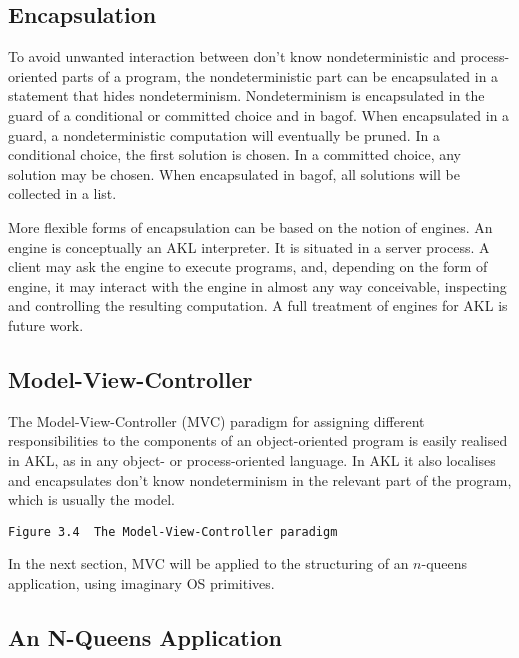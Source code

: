 \subsection{Encapsulation}

To avoid unwanted interaction between don't know nondeterministic and
process-oriented parts of a program, the nondeterministic part can be
encapsulated in a statement that hides nondeterminism.  Nondeterminism
is encapsulated in the guard of a conditional or committed choice and
in bagof.  When encapsulated in a guard, a nondeterministic
computation will eventually be pruned.  In a conditional choice, the
first solution is chosen.  In a committed choice, any solution may be
chosen.  When encapsulated in bagof, all solutions will be collected
in a list.

More flexible forms of encapsulation can be based on the notion of
engines.  An engine is conceptually an AKL interpreter.  It is situated
in a server process.  A client may ask the engine to execute programs,
and, depending on the form of engine, it may interact with the engine
in almost any way conceivable, inspecting and controlling the
resulting computation.  A full treatment of engines for AKL is future
work.

\subsection{Model-View-Controller}

The Model-View-Controller (MVC) paradigm for assigning different
responsibilities to the components of an object-oriented program is
easily realised in AKL, as in any object- or process-oriented
language.  In AKL it also localises and encapsulates don't know
nondeterminism in the relevant part of the program, which is usually
the model.
                                     
\verb|Figure 3.4  The Model-View-Controller paradigm|

In the next section, MVC will be applied to the structuring of an
$n$-queens application, using imaginary OS primitives.

\subsection{An N-Queens Application}

